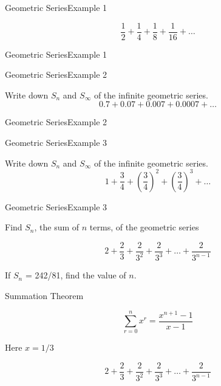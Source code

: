 \documentclass[12pt]{article}
\begin{document}
{Geometric Series}{Example 1}


\[ \frac{1}{2} + \frac{1}{4} + \frac{1}{8} +  \frac{1}{16} +\ldots  \]




{Geometric Series}{Example 1}




{Geometric Series}{Example 2}

Write down $S_n$ and $S_{\infty}$ of the infinite geometric series.
\[ 0.7 + 0.07 + 0.007 + 0.0007 + \ldots  \]


{Geometric Series}{Example 2}



{Geometric Series}{Example 3}

Write down $S_n$ and $S_{\infty}$ of the infinite geometric series.
\[ 1 + \frac{3}{4} + \left( \frac{3}{4} \right)^2 + \left( \frac{3}{4} \right)^3 + \ldots  \]



{Geometric Series}{Example 3}






Find $S_n$, the sum of $n$ terms, of the geometric series

\[  2 + \frac{2}{3} + \frac{2}{3^2} + \frac{2}{3^3} +  \ldots + \frac{2}{3^{n-1}} \]

If $S_n$ = 242/81, find the value of $n$.




Summation Theorem

\[ \sum^{n}_{r=0} x^r = \frac{x^{n+1}-1}{x-1} \]

Here $x = 1/3$

\[  2 + \frac{2}{3} + \frac{2}{3^2} + \frac{2}{3^3} +  \ldots + \frac{2}{3^{n-1}} \]





\end{document}
